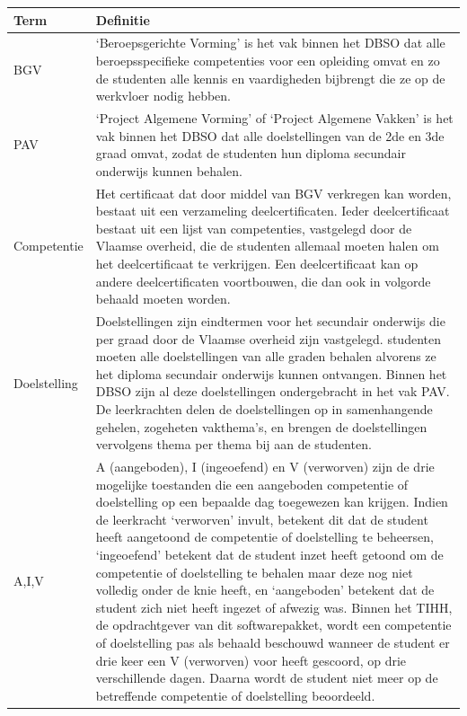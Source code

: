 \documentclass[a4paper]{article}
\begin{document}
\newpage
\begin{tabularx}{\textwidth}{l | X}
    Term & Definitie \\
    \hline \hline
    BGV & `Beroepsgerichte Vorming' is het vak binnen het DBSO dat alle beroepsspecifieke competenties voor een opleiding omvat en zo de studenten alle kennis en vaardigheden bijbrengt die ze op de werkvloer nodig hebben. \\
    \hline
    PAV & `Project Algemene Vorming' of `Project Algemene Vakken' is het vak binnen het DBSO dat alle doelstellingen van de 2de en 3de graad omvat, zodat de studenten hun diploma secundair onderwijs kunnen behalen. \\
    \hline
    Competentie & Het certificaat dat door middel van BGV verkregen kan worden, bestaat uit een verzameling deelcertificaten. Ieder deelcertificaat bestaat uit een lijst van competenties, vastgelegd door de Vlaamse overheid, die de studenten allemaal moeten halen om het deelcertificaat te verkrijgen. Een deelcertificaat kan op andere deelcertificaten voortbouwen, die dan ook in volgorde behaald moeten worden. \cite{Competenties} \\
    \hline
    Doelstelling & Doelstellingen zijn eindtermen voor het secundair onderwijs die per graad door de Vlaamse overheid zijn vastgelegd. studenten moeten alle doelstellingen van alle graden behalen alvorens ze het diploma secundair onderwijs kunnen ontvangen. Binnen het DBSO zijn al deze doelstellingen ondergebracht in het vak PAV. De leerkrachten delen de doelstellingen op in samenhangende gehelen, zogeheten vakthema's, en brengen de doelstellingen vervolgens thema per thema bij aan de studenten. \cite{Doelstellingen} \\
    \hline
    A,I,V & A (aangeboden), I (ingeoefend) en V (verworven) zijn de drie mogelijke toestanden die een aangeboden competentie of doelstelling op een bepaalde dag toegewezen kan krijgen. Indien de leerkracht `verworven' invult, betekent dit dat de student heeft aangetoond de competentie of doelstelling te beheersen, `ingeoefend' betekent dat de student inzet heeft getoond om de competentie of doelstelling te behalen maar deze nog niet volledig onder de knie heeft, en `aangeboden' betekent dat de student zich niet heeft ingezet of afwezig was. Binnen het TIHH, de opdrachtgever van dit softwarepakket, wordt een competentie of doelstelling pas als behaald beschouwd wanneer de student er drie keer een V (verworven) voor heeft gescoord, op drie verschillende dagen. Daarna wordt de student niet meer op de betreffende competentie of doelstelling beoordeeld.
\end{tabularx}
\end{document}
